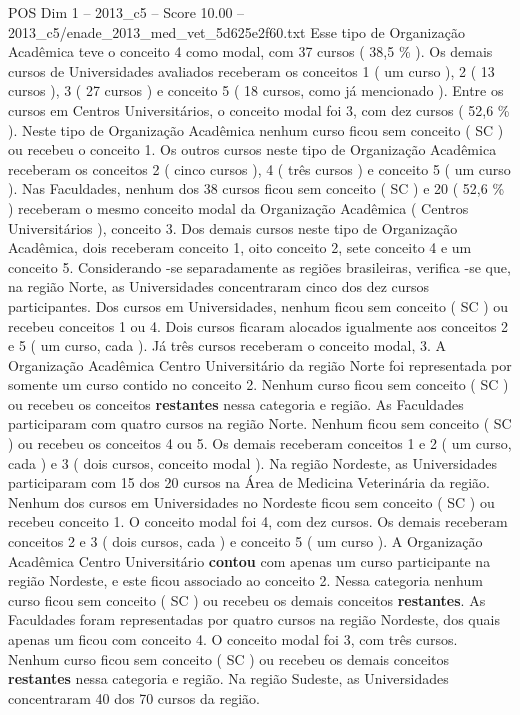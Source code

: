 \begin{textsample}{POS Dim 1 – 2013\_c5 – Score 10.00 – 2013\_c5/enade\_2013\_med\_vet\_5d625e2f60.txt}
Esse tipo de Organização Acadêmica teve o conceito 4 como modal, com 37 cursos ( 38,5 \% ).
Os demais cursos de Universidades avaliados receberam os conceitos 1 ( um curso ), 2 ( 13 cursos ), 3 ( 27 cursos ) e conceito 5 ( 18 cursos, como já mencionado ).
Entre os cursos em Centros Universitários, o conceito modal foi 3, com dez cursos ( 52,6 \% ).
Neste tipo de Organização Acadêmica nenhum curso ficou sem conceito ( SC ) ou recebeu o conceito 1.
Os outros cursos neste tipo de Organização Acadêmica receberam os conceitos 2 ( cinco cursos ), 4 ( três cursos ) e conceito 5 ( um curso ).
Nas Faculdades, nenhum dos 38 cursos ficou sem conceito ( SC ) e 20 ( 52,6 \% ) receberam o mesmo conceito modal da Organização Acadêmica ( Centros Universitários ), conceito 3.
Dos demais cursos neste tipo de Organização Acadêmica, dois receberam conceito 1, oito conceito 2, sete conceito 4 e um conceito 5.
Considerando -se separadamente as regiões brasileiras, verifica -se que, na região Norte, as Universidades concentraram cinco dos dez cursos participantes.
Dos cursos em Universidades, nenhum ficou sem conceito ( SC ) ou recebeu conceitos 1 ou 4.
Dois cursos ficaram alocados igualmente aos conceitos 2 e 5 ( um curso, cada ).
Já três cursos receberam o conceito modal, 3.
A Organização Acadêmica Centro Universitário da região Norte foi representada por somente um curso contido no conceito 2.
Nenhum curso ficou sem conceito ( SC ) ou recebeu os conceitos \textbf{restantes} nessa categoria e região.
As Faculdades participaram com quatro cursos na região Norte.
Nenhum ficou sem conceito ( SC ) ou recebeu os conceitos 4 ou 5.
Os demais receberam conceitos 1 e 2 ( um curso, cada ) e 3 ( dois cursos, conceito modal ).
Na região Nordeste, as Universidades participaram com 15 dos 20 cursos na Área de Medicina Veterinária da região.
Nenhum dos cursos em Universidades no Nordeste ficou sem conceito ( SC ) ou recebeu conceito 1.
O conceito modal foi 4, com dez cursos.
Os demais receberam conceitos 2 e 3 ( dois cursos, cada ) e conceito 5 ( um curso ).
A Organização Acadêmica Centro Universitário \textbf{contou} com apenas um curso participante na região Nordeste, e este ficou associado ao conceito 2.
Nessa categoria nenhum curso ficou sem conceito ( SC ) ou recebeu os demais conceitos \textbf{restantes}.
As Faculdades foram representadas por quatro cursos na região Nordeste, dos quais apenas um ficou com conceito 4.
O conceito modal foi 3, com três cursos.
Nenhum curso ficou sem conceito ( SC ) ou recebeu os demais conceitos \textbf{restantes} nessa categoria e região.
Na região Sudeste, as Universidades concentraram 40 dos 70 cursos da região.

\end{textsample}
